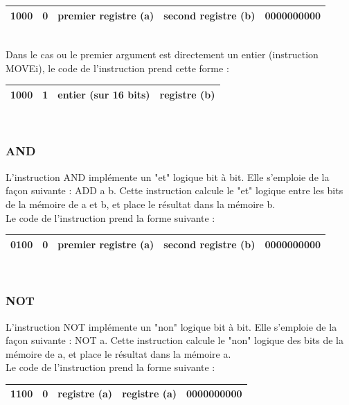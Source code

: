 \documentclass[a4paper, 12pt, twoside]{report}
\begin{document}
\begin{tabular}{|c|c|c|c|c|}
  \hline
  1000 & 0 & premier registre (a) & second registre (b) & 0000000000 \\
  \hline
\end{tabular}\\

Dans le cas ou le premier argument est directement un entier (instruction MOVEi),
le code de l'instruction prend cette forme :

\begin{tabular}{|c|c|c|c|}
  \hline
  1000 & 1 & entier (sur 16 bits) & registre (b) \\
  \hline
\end{tabular}\\


\subsubsection{AND}

L'instruction AND implémente un "et" logique bit à bit. Elle s'emploie de la façon suivante :
ADD a b. Cette instruction calcule le "et" logique entre les bits de la mémoire de a et b, 
et place le résultat dans la mémoire b.\\

Le code de l'instruction prend la forme suivante :

\begin{tabular}{|c|c|c|c|c|}
  \hline
  0100 & 0 & premier registre (a) & second registre (b) & 0000000000 \\
  \hline
\end{tabular}\\

\subsubsection{NOT}

L'instruction NOT implémente un "non" logique bit à bit. Elle s'emploie de la façon suivante :
NOT a. Cette instruction calcule le "non" logique des bits de la mémoire de a,
et place le résultat dans la mémoire a.\\

Le code de l'instruction prend la forme suivante :

\begin{tabular}{|c|c|c|c|c|}
  \hline
  1100 & 0 & registre (a) & registre (a) & 0000000000  \\
  \hline
\end{tabular}\\
\end{document}
